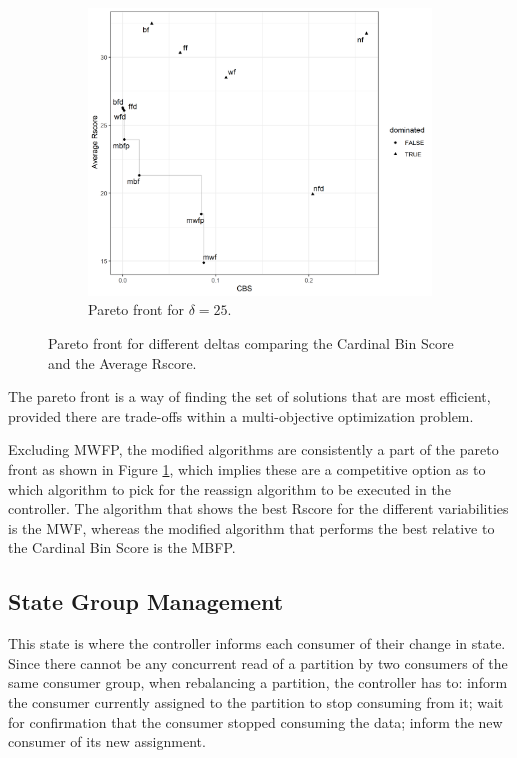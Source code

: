 \begin{figure}[H]
    \begin{subfigure}{0.3\textwidth}
        \includegraphics[width=\textwidth]{images/controller/pareto_front/25.png}
        \caption{Pareto front for $\delta = 25$.}
    \end{subfigure}
    \caption{Pareto front for different deltas comparing the Cardinal Bin Score
    and the Average Rscore.}
    \label{fig:pareto_front} 
\end{figure}

The pareto front is a way of finding the set of solutions that are most
efficient, provided there are trade-offs within a multi-objective optimization
problem.

Excluding MWFP, the modified algorithms are consistently a part of the pareto
front as shown in Figure \ref{fig:pareto_front}, which implies these are a
competitive option as to which algorithm to pick for the reassign algorithm to
be executed in the controller. The algorithm that shows the best Rscore for the
different variabilities is the MWF, whereas the modified algorithm that performs
the best relative to the Cardinal Bin Score is the MBFP.

\subsection{State Group Management}
\label{sub:state_group_management}

This state is where the controller informs each consumer of their change in
state. Since there cannot be any concurrent read of a partition by two consumers
of the same consumer group, when rebalancing a partition, the controller has to:
inform the consumer currently assigned to the partition to stop
consuming from it; wait for confirmation that the consumer stopped consuming the
data; inform the new consumer of its new assignment.

